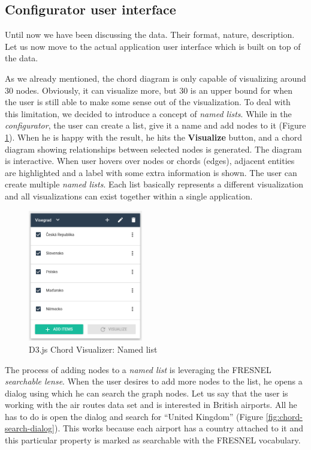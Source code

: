 \subsection{Configurator user interface}

Until now we have been discussing the data. Their format, nature, description. Let us now move to the actual application user interface which is built on top of the data. 


As we already mentioned, the chord diagram is only capable of visualizing around 30 nodes. Obviously, it can visualize more, but 30 is an upper bound for when the user is still able to make some sense out of the visualization. To deal with this limitation, we decided to introduce a concept of \emph{named lists}. While in the \emph{configurator}, the user can create a list, give it a name and add nodes to it (Figure \ref{fig:chord-named-list}). When he is happy with the result, he hits the \textbf{Visualize} button, and a chord diagram showing relationships between selected nodes is generated. The diagram is interactive. When user hovers over nodes or chords (edges), adjacent entities are highlighted and a label with some extra information is shown. The user can create multiple \emph{named lists}. Each list basically represents a different visualization and all visualizations can exist together within a single application.
\begin{figure}
	\centering
	\includegraphics[width=50mm]{img/06_chord_named_list.png}
	\caption{D3.js Chord Visualizer: Named list}
    \label{fig:chord-named-list}
\end{figure}

The process of adding nodes to a \emph{named list} is leveraging the FRESNEL \emph{searchable lense}. When the user desires to add more nodes to the  list, he opens a dialog using which he can search the graph nodes. Let us say that the user is working with the air routes data set and is interested in British airports. All he has to do is open the dialog and search for “United Kingdom” (Figure \ref{fig:chord-search-dialog}). This works because each airport has a country attached to it and this particular property is marked as searchable with the FRESNEL vocabulary.

